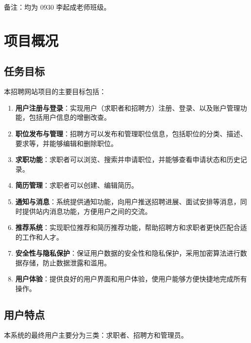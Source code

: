 \documentclass[UTF8,a4paper,10pt]{ctexart}
\begin{document}
备注：均为 0930 李起成老师班级。


\section{项目概况}
\subsection{任务目标}

本招聘网站项目的主要目标包括：

\begin{enumerate}
    \item \textbf{用户注册与登录}：实现用户（求职者和招聘方）注册、登录、以及账户管理功能，包括用户信息的增删改查。
    \item \textbf{职位发布与管理}：招聘方可以发布和管理职位信息，包括职位的分类、描述、要求等，并能够编辑和删除职位。
    \item \textbf{求职功能}：求职者可以浏览、搜索并申请职位，并能够查看申请状态和历史记录。
    \item \textbf{简历管理}：求职者可以创建、编辑简历。
    \item \textbf{通知与消息}：系统提供通知功能，向用户推送招聘进展、面试安排等消息，同时提供站内消息功能，方便用户之间的交流。
    \item \textbf{推荐系统}：实现职位推荐和简历推荐功能，帮助招聘方和求职者更快匹配合适的工作和人才。
    \item \textbf{安全性与隐私保护}：保证用户数据的安全性和隐私保护，采用加密算法进行数据存储，防止数据泄露和滥用。
    \item \textbf{用户体验}：提供良好的用户界面和用户体验，使用户能够方便快捷地完成所有操作。
\end{enumerate}

\subsection{用户特点}
本系统的最终用户主要分为三类：求职者、招聘方和管理员。
\end{document}
